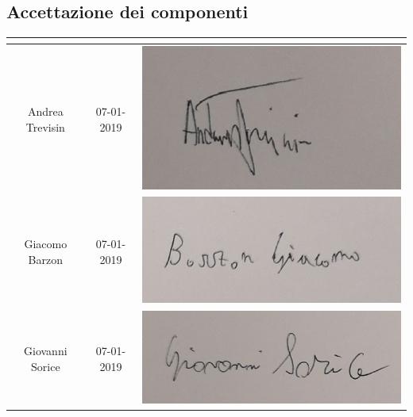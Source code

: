 \subsection{Accettazione dei componenti}
\renewcommand{\arraystretch}{2}
\begin{table}[H]
\begin{center}
  \begin{tabular}{| c | c | c |}
    \hline
    \rowcolor{title_row}
    \textbf{\color{title_text}{Nominativo}} & \textbf{\color{title_text}{Data}} & \textbf{\color{title_text}{Firma}} \\ \hline
    Andrea Trevisin & 07-01-2019 & \includegraphics[align=c,scale=0.25]{Res/Firme/andrea.jpg} \\ \hline
    Giacomo Barzon & 07-01-2019 & \includegraphics[align=c,scale=0.25]{Res/Firme/giacomo.jpg} \\ \hline
    Giovanni Sorice & 07-01-2019 & \includegraphics[align=c,scale=0.25]{Res/Firme/ciro.jpg} \\ \hline

\end{tabular}
\end{center}
\end{table}
